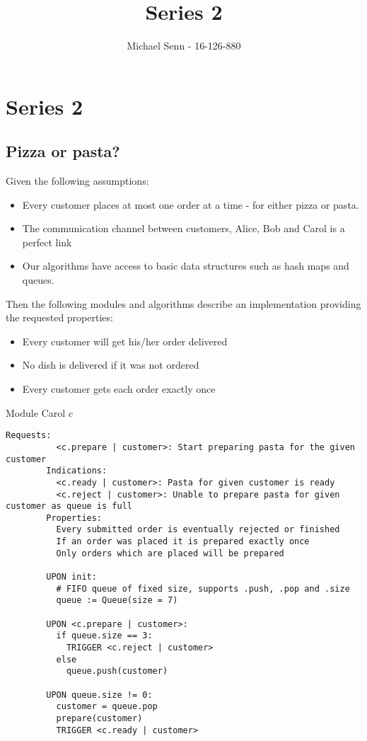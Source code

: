 \documentclass[a4paper]{scrreprt}
\title{Series 2}
\author{Michael Senn \maillink{michael.senn@students.unibe.ch} - 16-126-880}
\date{\printdate}
\begin{document}
\maketitle


\setcounter{chapter}{1}

\chapter{Series 2}

\section{Pizza or pasta?}

Given the following assumptions:
\begin{itemize}
	\item Every customer places at most one order at a time - for either
		pizza or pasta.
	\item The communication channel between customers, Alice, Bob and Carol
		is a perfect link
	\item Our algorithms have access to basic data structures such as hash
		maps and queues.
\end{itemize}

Then the following modules and algorithms describe an implementation providing
the requested properties:

\begin{itemize}
	\item Every customer will get his/her order delivered
	\item No dish is delivered if it was not ordered
	\item Every customer gets each order exactly once
\end{itemize}

\begin{library}{Module Carol $c$}
        \begin{lstlisting}[mathescape=true,autogobble=true,breaklines=true]
		Requests:
		  <c.prepare | customer>: Start preparing pasta for the given customer
		Indications:
		  <c.ready | customer>: Pasta for given customer is ready
		  <c.reject | customer>: Unable to prepare pasta for given customer as queue is full
		Properties:
		  Every submitted order is eventually rejected or finished
		  If an order was placed it is prepared exactly once
		  Only orders which are placed will be prepared

		UPON init:
		  # FIFO queue of fixed size, supports .push, .pop and .size
		  queue := Queue(size = 7)

		UPON <c.prepare | customer>:
		  if queue.size == 3:
		    TRIGGER <c.reject | customer>
		  else
		    queue.push(customer)

		UPON queue.size != 0:
		  customer = queue.pop
		  prepare(customer)
		  TRIGGER <c.ready | customer>
        \end{lstlisting}
\end{library}
\end{document}
